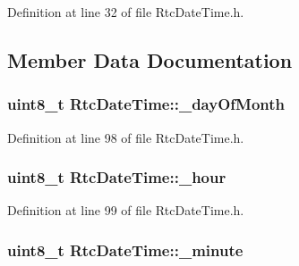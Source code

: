 Definition at line 32 of file Rtc\+Date\+Time.\+h.



\subsection{Member Data Documentation}
\subsubsection[{\texorpdfstring{\+\_\+day\+Of\+Month}{_dayOfMonth}}]{\setlength{\rightskip}{0pt plus 5cm}uint8\+\_\+t Rtc\+Date\+Time\+::\+\_\+day\+Of\+Month\hspace{0.3cm}{\ttfamily [protected]}}\hypertarget{class_rtc_date_time_a12da2c12bb874dd069e092f9998c0e0c}{}\label{class_rtc_date_time_a12da2c12bb874dd069e092f9998c0e0c}


Definition at line 98 of file Rtc\+Date\+Time.\+h.

\subsubsection[{\texorpdfstring{\+\_\+hour}{_hour}}]{\setlength{\rightskip}{0pt plus 5cm}uint8\+\_\+t Rtc\+Date\+Time\+::\+\_\+hour\hspace{0.3cm}{\ttfamily [protected]}}\hypertarget{class_rtc_date_time_a93fcc560a087734a015cf63477708a78}{}\label{class_rtc_date_time_a93fcc560a087734a015cf63477708a78}


Definition at line 99 of file Rtc\+Date\+Time.\+h.

\subsubsection[{\texorpdfstring{\+\_\+minute}{_minute}}]{\setlength{\rightskip}{0pt plus 5cm}uint8\+\_\+t Rtc\+Date\+Time\+::\+\_\+minute\hspace{0.3cm}{\ttfamily [protected]}}\hypertarget{class_rtc_date_time_a9f29cd580a5c8a60212cb96a553865cf}{}\label{class_rtc_date_time_a9f29cd580a5c8a60212cb96a553865cf}


